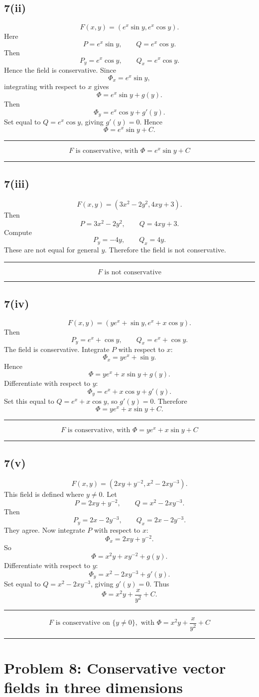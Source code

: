 \documentclass[11pt,a4paper]{article}
\newenvironment{resultbox}{\par\medskip\noindent\begin{minipage}{\linewidth}\hrule\smallskip}{\smallskip\hrule\end{minipage}\par\medskip}
\newcommand{\ans}[1]{\begin{resultbox}\[\boxed{#1}\]\end{resultbox}}
\begin{document}
\subsection*{7(ii)}
\[
F(x,y)=(e^x\sin y,
 e^x\cos y).
\]
Here
\[
P=e^x\sin y,
\qquad Q=e^x\cos y.
\]
Then
\[
P_y=e^x\cos y,
\qquad Q_x=e^x\cos y.
\]
Hence the field is conservative. Since
\[
\Phi_x=e^x\sin y,
\]
integrating with respect to \(x\) gives
\[
\Phi=e^x\sin y+g(y).
\]
Then
\[
\Phi_y=e^x\cos y+g'(y).
\]
Set equal to \(Q=e^x\cos y\), giving \(g'(y)=0\). Hence
\[
\Phi=e^x\sin y+C.
\]
\ans{F\text{ is conservative, with }\Phi=e^x\sin y+C}

\subsection*{7(iii)}
\[
F(x,y)=(3x^2-2y^2,
4xy+3).
\]
Then
\[
P=3x^2-2y^2,
\qquad Q=4xy+3.
\]
Compute
\[
P_y=-4y,
\qquad Q_x=4y.
\]
These are not equal for general \(y\). Therefore the field is not conservative.
\ans{F\text{ is not conservative}}

\subsection*{7(iv)}
\[
F(x,y)=(ye^x+\sin y,
 e^x+x\cos y).
\]
Then
\[
P_y=e^x+\cos y,
\qquad Q_x=e^x+\cos y.
\]
The field is conservative. Integrate \(P\) with respect to \(x\):
\[
\Phi_x=ye^x+\sin y.
\]
Hence
\[
\Phi=ye^x+x\sin y+g(y).
\]
Differentiate with respect to \(y\):
\[
\Phi_y=e^x+x\cos y+g'(y).
\]
Set this equal to \(Q=e^x+x\cos y\), so \(g'(y)=0\). Therefore
\[
\Phi=ye^x+x\sin y+C.
\]
\ans{F\text{ is conservative, with }\Phi=ye^x+x\sin y+C}

\subsection*{7(v)}
\[
F(x,y)=(2xy+y^{-2},
 x^2-2xy^{-3}).
\]
This field is defined where \(y\ne0\). Let
\[
P=2xy+y^{-2},
\qquad Q=x^2-2xy^{-3}.
\]
Then
\[
P_y=2x-2y^{-3},
\qquad Q_x=2x-2y^{-3}.
\]
They agree. Now integrate \(P\) with respect to \(x\):
\[
\Phi_x=2xy+y^{-2}.
\]
So
\[
\Phi=x^2y+xy^{-2}+g(y).
\]
Differentiate with respect to \(y\):
\[
\Phi_y=x^2-2xy^{-3}+g'(y).
\]
Set equal to \(Q=x^2-2xy^{-3}\), giving \(g'(y)=0\). Thus
\[
\Phi=x^2y+\frac{x}{y^2}+C.
\]
\ans{F\text{ is conservative on }\{y\ne0\},\text{ with }\Phi=x^2y+\frac{x}{y^2}+C}

\section{Problem 8: Conservative vector fields in three dimensions}
\end{document}

